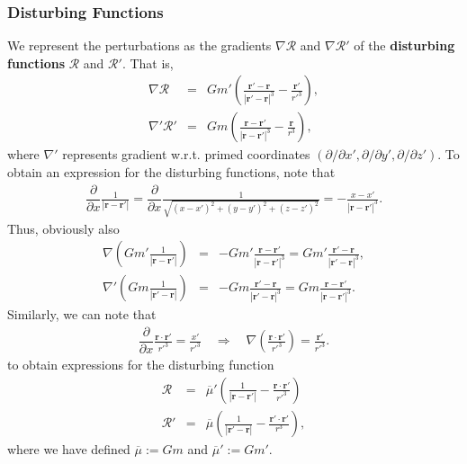 \documentclass [12pt, a4paper] {article}
\newcommand{\vc}[1]
{
	\boldsymbol{#1}
}
\newcommand{\pdiff}[2]
{
	\dfrac{\partial #1}{\partial #2}
}
\begin{document}
\subsubsection{Disturbing Functions}
We represent the perturbations as the gradients $\nabla\mathcal R$ and 
$\nabla\mathcal R'$ of the \textbf{disturbing functions} $\mathcal R$ and $\mathcal R'$.
That is, 
\begin {eqnarray}
    \nabla\mathcal{R}
    &=&
    Gm'\left(\frac{\vc r' - \vc r}{|\vc r' - \vc r|^3}
    - 
    \frac{\vc r'}{r'^3} 
    \right),
    \\
    \nabla'\mathcal{R}'
    &=&
    Gm\left(\frac{\vc r - \vc r'}{|\vc r - \vc r'|^3}
    - 
    \frac{\vc r}{r^3} 
    \right),
\end {eqnarray}
where $\nabla'$ represents gradient w.r.t. primed coordinates 
$(\partial/\partial x', \partial/\partial y', \partial/\partial z')$.
To obtain an expression for the disturbing functions, note that 
\begin {eqnarray}
    \pdiff{}{x}\frac{1}{|\vc r - \vc r'|}
    =
    \pdiff{}{x}\frac{1}{\sqrt{(x-x')^2 + (y-y')^2 + (z-z')^2}}
    =
    -\frac{x - x'}{|\vc r - \vc r'|^3}.
\end {eqnarray}
Thus, obviously also 
\begin {eqnarray}
    \nabla\left(Gm'\frac{1}{|\vc r - \vc r'|}\right) 
    &=& 
    -Gm'\frac{\vc r - \vc r'}{|\vc r - \vc r'|^3}
    =
    Gm'\frac{\vc r' - \vc r}{|\vc r' - \vc r|^3},
    \\
    \nabla'\left(Gm\frac{1}{|\vc r' - \vc r|}\right) 
    &=& 
    -Gm\frac{\vc r' - \vc r}{|\vc r' - \vc r|^3}
    =
    Gm\frac{\vc r - \vc r'}{|\vc r - \vc r'|^3}. 
\end {eqnarray}
Similarly, we can note that 
\begin {eqnarray}
    \pdiff{}{x}\frac{\vc r\cdot\vc r'}{r'^3} = \frac{x'}{r'^3}
    \quad
    \Rightarrow
    \quad
    \nabla\left(\frac{\vc r\cdot\vc r'}{r'^3}\right)
    = \frac{\vc r'}{r'^3}.
\end {eqnarray}
to obtain expressions for the disturbing function
\begin {eqnarray}
    \mathcal R 
    &=& 
    \overline{\mu}'\left(
        \frac{1}{|\vc r - \vc r'|}
        -
        \frac{\vc r\cdot\vc r'}{r'^3}
    \right)
    \\
    \mathcal R'
    &=& 
    \overline{\mu}\left(
        \frac{1}{|\vc r' - \vc r|}
        -
        \frac{\vc r'\cdot\vc r'}{r^3}
    \right),
\end {eqnarray}
where we have defined $\overline\mu := Gm$ and $\overline{\mu}' := Gm'$.
\end{document}
